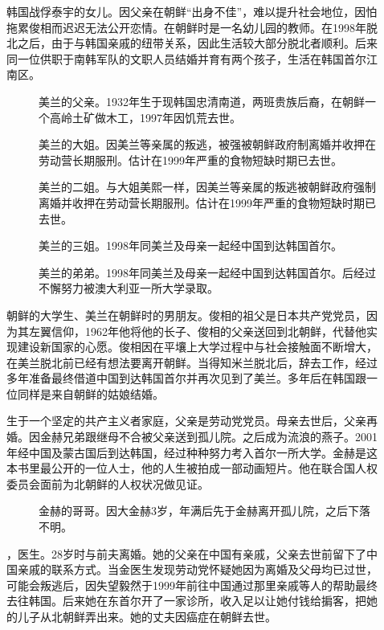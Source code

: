\begin{description}
	\item[] 韩国战俘泰宇的女儿。因父亲在朝鲜“出身不佳”，难以提升社会地位，因怕拖累俊相而迟迟无法公开恋情。在朝鲜时是一名幼儿园的教师。在1998年脱北之后，由于与韩国亲戚的纽带关系，因此生活较大部分脱北者顺利。后来同一位供职于南韩军队的文职人员结婚并育有两个孩子，生活在韩国首尔江南区。
		{\footnotesize \begin{description}
				\item[] 美兰的父亲。1932年生于现韩国忠清南道，两班贵族后裔，在朝鲜一个高岭土矿做木工，1997年因饥荒去世。
				\item[] 美兰的大姐。因美兰等亲属的叛逃，被强被朝鲜政府制离婚并收押在劳动营长期服刑。估计在1999年严重的食物短缺时期已去世。
				\item[] 美兰的二姐。与大姐美熙一样，因美兰等亲属的叛逃被朝鲜政府强制离婚并收押在劳动营长期服刑。估计在1999年严重的食物短缺时期已去世。
				\item[] 美兰的三姐。1998年同美兰及母亲一起经中国到达韩国首尔。
				\item[] 美兰的弟弟。1998年同美兰及母亲一起经中国到达韩国首尔。后经过不懈努力被澳大利亚一所大学录取。
		\end{description}}
	
	\item[] 朝鲜的大学生、美兰在朝鲜时的男朋友。俊相的祖父是日本共产党党员，因为其左翼信仰，1962年他将他的长子、俊相的父亲送回到北朝鲜，代替他实现建设新国家的心愿。俊相因在平壤上大学过程中与社会接触面不断增大，在美兰脱北前已经有想法要离开朝鲜。当得知米兰脱北后，辞去工作，经过多年准备最终借道中国到达韩国首尔并再次见到了美兰。多年后在韩国跟一位同样是来自朝鲜的姑娘结婚。\\
	
	\item[] 生于一个坚定的共产主义者家庭，父亲是劳动党党员。母亲去世后，父亲再婚。因金赫兄弟跟继母不合被父亲送到孤儿院。之后成为流浪的燕子。2001年经中国及蒙古国后到达韩国，经过种种努力考入首尔一所大学。金赫是这本书里最公开的一位人士，他的人生被拍成一部动画短片。他在联合国人权委员会面前为北朝鲜的人权状况做见证。
		{\footnotesize \begin{description}
			\item[] 金赫的哥哥。因大金赫3岁，年满后先于金赫离开孤儿院，之后下落不明。
		\end{description}}
	
	\item[] ，医生。28岁时与前夫离婚。她的父亲在中国有亲戚，父亲去世前留下了中国亲戚的联系方式。当金医生发现劳动党怀疑她因为离婚及父母均已过世，可能会叛逃后，因失望毅然于1999年前往中国通过那里亲戚等人的帮助最终去往韩国。后来她在东首尔开了一家诊所，收入足以让她付钱给掮客，把她的儿子从北朝鲜弄出来。她的丈夫因癌症在朝鲜去世。\\
\end{description}